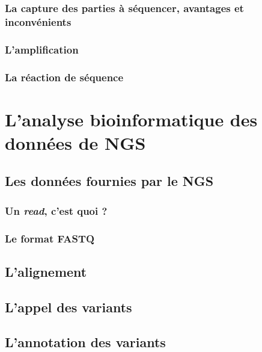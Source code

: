 \documentclass[12pt,twoside]{ugathesis}
\begin{document}
\subsubsection{La capture des parties à séquencer, avantages et
inconvénients}\label{la-capture-des-parties-a-sequencer-avantages-et-inconvenients}

\subsubsection{L'amplification}\label{lamplification}

\subsubsection{La réaction de séquence}\label{la-reaction-de-sequence}

\section{L'analyse bioinformatique des données de
NGS}\label{lanalyse-bioinformatique-des-donnees-de-ngs}

\subsection{Les données fournies par le
NGS}\label{les-donnees-fournies-par-le-ngs}

\subsubsection{\texorpdfstring{Un \emph{read}, c'est quoi
?}{Un read, c'est quoi ?}}\label{un-read-cest-quoi}

\subsubsection{Le format FASTQ}\label{fastq}

\subsection{L'alignement}\label{lalignement}

\subsection{L'appel des variants}\label{varcall}

\subsection{L'annotation des variants}\label{lannotation-des-variants}
\end{document}
